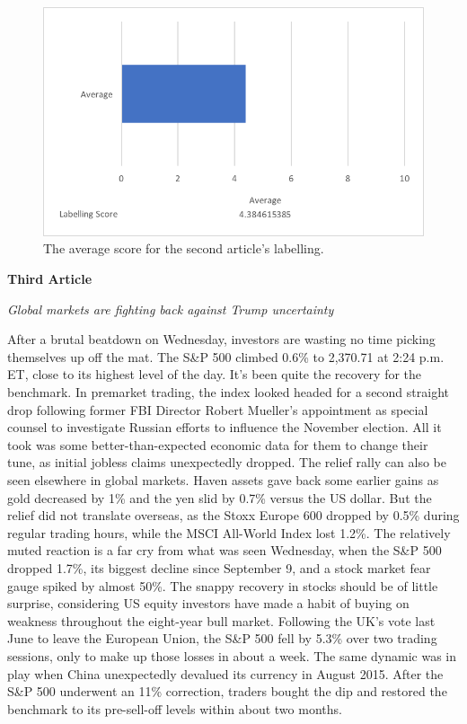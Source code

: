 \documentclass[12pt]{article}
\begin{document}
\begin{figure}[ht!]
  \centering
    \includegraphics[scale=0.7]{label2score.png}
   \caption[The average score for a labelling]{The average score for the second article's labelling.}
   \label{label2}
\end{figure} 

\textbf{Third Article}

\emph{Global markets are fighting back against Trump uncertainty}

After a brutal beatdown on Wednesday, investors are wasting no time picking themselves up off the mat. The S\&P 500 climbed 0.6\% to 2,370.71 at 2:24 p.m. ET, close to its highest level of the day. It's been quite the recovery for the benchmark. In premarket trading, the index looked headed for a second straight drop following former FBI Director Robert Mueller's appointment as special counsel to investigate Russian efforts to influence the November election. All it took was some better-than-expected economic data for them to change their tune, as initial jobless claims unexpectedly dropped. The relief rally can also be seen elsewhere in global markets. Haven assets gave back some earlier gains as gold decreased by 1\% and the yen slid by 0.7\% versus the US dollar. But the relief did not translate overseas, as the Stoxx Europe 600 dropped by 0.5\% during regular trading hours, while the MSCI All-World Index lost 1.2\%. The relatively muted reaction is a far cry from what was seen Wednesday, when the S\&P 500 dropped 1.7\%, its biggest decline since September 9, and a stock market fear gauge spiked by almost 50\%. The snappy recovery in stocks should be of little surprise, considering US equity investors have made a habit of buying on weakness throughout the eight-year bull market. Following the UK's vote last June to leave the European Union, the S\&P 500 fell by 5.3\% over two trading sessions, only to make up those losses in about a week. The same dynamic was in play when China unexpectedly devalued its currency in August 2015. After the S\&P 500 underwent an 11\% correction, traders bought the dip and restored the benchmark to its pre-sell-off levels within about two months. \\
\end{document}
